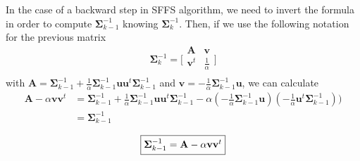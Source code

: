\documentclass[a4paper]{article}
\begin{document}
        In the case of a backward step in SFFS algorithm, we need to invert the formula in order to compute $\boldsymbol{\Sigma}_{k-1}^{-1}$ knowing $\boldsymbol{\Sigma}_k^{-1}$. Then, if we use the following notation for the previous matrix
        \begin{equation*}
            \boldsymbol{\Sigma}_k^{-1} =
            \bigg[\begin{array}{cc}
            \mathbf{A}   & \mathbf{v} \\
            \mathbf{v}^t & \frac{1}{\alpha} \\
            \end{array}\bigg]
        \end{equation*}
        with $\mathbf{A} = \boldsymbol{\Sigma}_{k-1}^{-1} + \frac{1}{\alpha} \boldsymbol{\Sigma}_{k-1}^{-1} \mathbf{u} \mathbf{u}^t \boldsymbol{\Sigma}_{k-1}^{-1}$ and $\mathbf{v} = - \frac{1}{\alpha} \boldsymbol{\Sigma}_{k-1}^{-1} \mathbf{u}$, we can calculate
        \begin{align*}
            \mathbf{A} - \alpha \mathbf{v} \mathbf{v}^t
            &= \boldsymbol{\Sigma}_{k-1}^{-1} + \frac{1}{\alpha} \boldsymbol{\Sigma}_{k-1}^{-1} \mathbf{u} \mathbf{u}^t \boldsymbol{\Sigma}_{k-1}^{-1} - \alpha (- \frac{1}{\alpha} \boldsymbol{\Sigma}_{k-1}^{-1} \mathbf{u}) (- \frac{1}{\alpha} \mathbf{u}^t \boldsymbol{\Sigma}_{k-1}^{-1})) \\
            &= \boldsymbol{\Sigma}_{k-1}^{-1}
        \end{align*}

        \begin{equation}
            \fbox{$\boldsymbol{\Sigma}_{k-1}^{-1} = \mathbf{A} - \alpha \mathbf{v} \mathbf{v}^t$}
        \end{equation}
\end{document}
